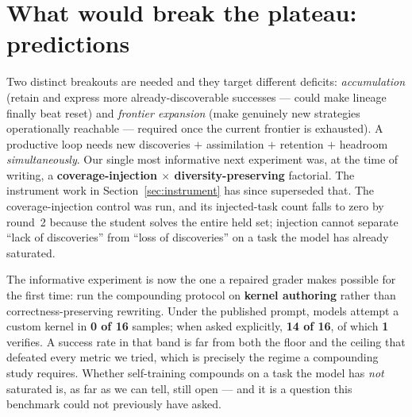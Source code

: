 \section{What would break the plateau: predictions}
Two distinct breakouts are needed and they target different deficits: \emph{accumulation} (retain and express
more already-discoverable successes --- could make lineage finally beat reset) and \emph{frontier expansion}
(make genuinely new strategies operationally reachable --- required once the current frontier is exhausted). A
productive loop needs new discoveries $+$ assimilation $+$ retention $+$ headroom \emph{simultaneously}. Our
single most informative next experiment was, at the time of writing, a \textbf{coverage-injection $\times$
diversity-preserving} factorial. The instrument work in Section~\ref{sec:instrument} has since superseded that.
The coverage-injection control was run, and its injected-task count falls to zero by round~2 because the student
solves the entire held set; injection cannot separate ``lack of discoveries'' from ``loss of discoveries'' on a
task the model has already saturated.

The informative experiment is now the one a repaired grader makes possible for the first time: run the
compounding protocol on \textbf{kernel authoring} rather than correctness-preserving rewriting. Under the
published prompt, models attempt a custom kernel in \textbf{0 of 16} samples; when asked explicitly, \textbf{14
of 16}, of which \textbf{1} verifies. A success rate in that band is far from both the floor and the ceiling
that defeated every metric we tried, which is precisely the regime a compounding study requires. Whether
self-training compounds on a task the model has \emph{not} saturated is, as far as we can tell, still open ---
and it is a question this benchmark could not previously have asked.

